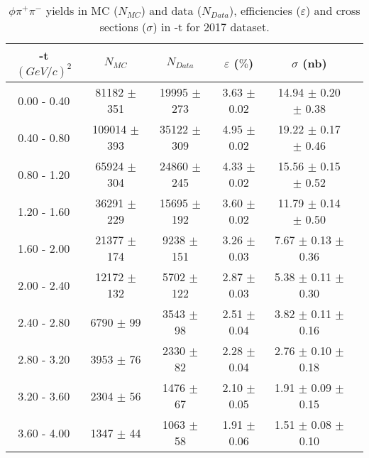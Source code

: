 \begin{center}
\begin{table}[H]
    \caption{$\phi \pi^{+}\pi^{-}$ yields in MC ($N_{MC}$) and data ($N_{Data}$), efficiencies ($\varepsilon$) and cross sections ($\sigma$) in $\mbox{-t}$ for 2017 dataset.}
    \label{tab.y2175.xsec_ul.phi2pi.2.2}
    \begin{tabular}{|c|c|c|c|c|c|}
    \hline
    -t $(GeV/c)^{2}$ & $N_{MC}$ & $N_{Data}$ & $\varepsilon$ ($\%$) & $\sigma$ (nb) \\ 
    \hline
    0.00 - 0.40 & 81182 $\pm$ 351 & 19995 $\pm$ 273 & 3.63 $\pm$ 0.02 & 14.94 $\pm$ 0.20 $\pm$ 0.38 \\ 
    0.40 - 0.80 & 109014 $\pm$ 393 & 35122 $\pm$ 309 & 4.95 $\pm$ 0.02 & 19.22 $\pm$ 0.17 $\pm$ 0.46 \\ 
    0.80 - 1.20 & 65924 $\pm$ 304 & 24860 $\pm$ 245 & 4.33 $\pm$ 0.02 & 15.56 $\pm$ 0.15 $\pm$ 0.52 \\ 
    1.20 - 1.60 & 36291 $\pm$ 229 & 15695 $\pm$ 192 & 3.60 $\pm$ 0.02 & 11.79 $\pm$ 0.14 $\pm$ 0.50 \\ 
    1.60 - 2.00 & 21377 $\pm$ 174 & 9238 $\pm$ 151 & 3.26 $\pm$ 0.03 & 7.67 $\pm$ 0.13 $\pm$ 0.36 \\ 
    2.00 - 2.40 & 12172 $\pm$ 132 & 5702 $\pm$ 122 & 2.87 $\pm$ 0.03 & 5.38 $\pm$ 0.11 $\pm$ 0.30 \\ 
    2.40 - 2.80 & 6790 $\pm$ 99 & 3543 $\pm$ 98 & 2.51 $\pm$ 0.04 & 3.82 $\pm$ 0.11 $\pm$ 0.16 \\ 
    2.80 - 3.20 & 3953 $\pm$ 76 & 2330 $\pm$ 82 & 2.28 $\pm$ 0.04 & 2.76 $\pm$ 0.10 $\pm$ 0.18 \\ 
    3.20 - 3.60 & 2304 $\pm$ 56 & 1476 $\pm$ 67 & 2.10 $\pm$ 0.05 & 1.91 $\pm$ 0.09 $\pm$ 0.15 \\ 
    3.60 - 4.00 & 1347 $\pm$ 44 & 1063 $\pm$ 58 & 1.91 $\pm$ 0.06 & 1.51 $\pm$ 0.08 $\pm$ 0.10 \\    
   \hline
\end{tabular}
\end{table}
\end{center}
   
